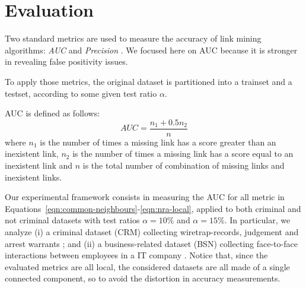 \section{Evaluation}
\label{sec:evaluation}

Two standard metrics are used to measure the accuracy of link mining algorithms: \textit{AUC} and  \textit{Precision} \cite{Lu2011}. We focused here on AUC because it is stronger in revealing false positivity issues.

To apply those metrics, the original dataset is partitioned into a trainset and a testset, according to some given test ratio $\alpha$. 



AUC is defined as follows:
%
\begin{equation}
\label{eqn:auc}
AUC=\frac{n_{1}+0.5n_{2}}{n}
\end{equation}
%
where 
$n_{1}$ is the number of times a missing link has a score greater than an inexistent link,
$n_{2}$ is the number of times a missing link has a score equal to an inexistent link and
$n$ is the total number of combination of missing links and inexistent links.

Our experimental framework consists in measuring the AUC for all metric in Equations~\ref{eqn:common-neighbours}-\ref{eqn:nra-local}, applied to both criminal and not criminal datasets with test ratios $\alpha=10\%$ and $\alpha=15\%$.
%
In particular, we analyze 
(i) a criminal dataset (CRM) collecting wiretrap-records, judgement and arrest warrants \cite{berlusconi2016link}; and
(ii) a business-related dataset (BSN) collecting face-to-face interactions between employees in a IT company \cite{olguin2009sensible}.
%
Notice that, since the evaluated metrics are all local, the considered datasets are all made of a single connected component, so to avoid the distortion in accuracy measurements.

